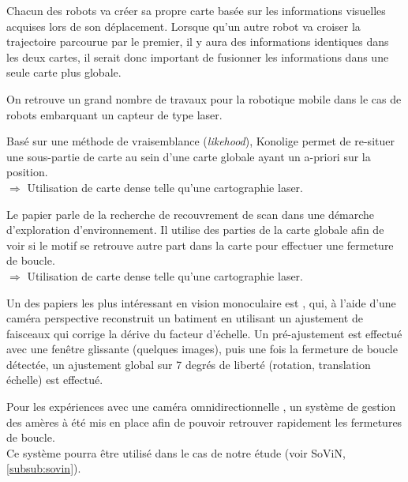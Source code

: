 Chacun des robots va créer sa propre carte basée sur les informations visuelles acquises lors de son déplacement.
Lorsque qu'un autre robot va croiser la trajectoire parcourue par le premier, il y aura des informations identiques dans les deux cartes, il serait donc important de fusionner les informations dans une seule carte plus globale.

On retrouve un grand nombre de travaux pour la robotique mobile dans le cas de robots embarquant un capteur de type laser.

Basé sur une méthode de vraisemblance (\textit{likehood}), Konolige \cite{Konolige03} permet de re-situer une sous-partie de carte au sein d'une carte globale ayant un a-priori sur la position.\\
$\Rightarrow$ Utilisation de carte dense telle qu'une cartographie laser.




Le papier \cite{Gutmann99} parle de la recherche de recouvrement de scan dans une démarche d'exploration d'environnement. 
Il utilise des parties de la carte globale afin de voir si le motif se retrouve autre part dans la carte pour effectuer une fermeture de boucle.\\
$\Rightarrow$ Utilisation de carte dense telle qu'une cartographie laser.



Un des papiers les plus intéressant en vision monoculaire est \cite{Strasdat10}, qui, à l'aide d'une caméra perspective reconstruit un batiment en utilisant un ajustement de faisceaux qui corrige la dérive du facteur d'échelle.
Un pré-ajustement est effectué avec une fenêtre glissante (quelques images), puis une fois la fermeture de boucle détectée, un ajustement global sur 7 degrés de liberté (rotation, translation échelle) est effectué. 



Pour les expériences avec une caméra omnidirectionnelle \cite{Korrapati11}, un système de gestion des amères à été mis en place afin de pouvoir retrouver rapidement les fermetures de boucle.\\
Ce système pourra être utilisé dans le cas de notre étude (voir SoViN, \ref{subsub:sovin}).



